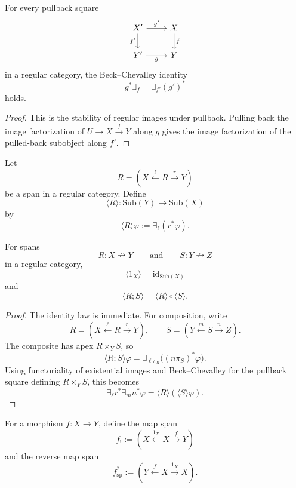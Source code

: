 \begin{proposition}
\label{prop:regular-beck-chevalley-relative}
For every pullback square
\[
\begin{tikzcd}
X' \arrow[r,"g'"] \arrow[d,"f'"']
&
X \arrow[d,"f"]
\\
Y' \arrow[r,"g"']
&
Y
\end{tikzcd}
\]
in a regular category, the Beck--Chevalley identity
\[
g^\ast\exists_f=\exists_{f'}(g')^\ast
\]
holds.
\end{proposition}

\begin{proof}
This is the stability of regular images under pullback. Pulling back the
image factorization of \(U\to X\xrightarrow{f}Y\) along \(g\) gives the image
factorization of the pulled-back subobject along \(f'\).
\end{proof}

\begin{definition}
\label{def:span-diamond-relative}
Let
\[
R=
\left(
X\xleftarrow{\ell}R\xrightarrow{r}Y
\right)
\]
be a span in a regular category. Define
\[
\langle R\rangle:\mathrm{Sub}(Y)\to\mathrm{Sub}(X)
\]
by
\[
\langle R\rangle\varphi
:=
\exists_\ell(r^\ast\varphi).
\]
\end{definition}

\begin{proposition}
\label{prop:diamond-functoriality-relative}
For spans
\[
R:X\nrightarrow Y
\qquad\text{and}\qquad
S:Y\nrightarrow Z
\]
in a regular category,
\[
\langle 1_X\rangle=\mathrm{id}_{\mathrm{Sub}(X)}
\]
and
\[
\langle R;S\rangle
=
\langle R\rangle\circ\langle S\rangle.
\]
\end{proposition}

\begin{proof}
The identity law is immediate. For composition, write
\[
R=(X\xleftarrow{\ell}R\xrightarrow{r}Y),
\qquad
S=(Y\xleftarrow{m}S\xrightarrow{n}Z).
\]
The composite has apex \(R\times_Y S\), so
\[
\langle R;S\rangle\varphi
=
\exists_{\ell\pi_R}\bigl((n\pi_S)^\ast\varphi\bigr).
\]
Using functoriality of existential images and Beck--Chevalley for the
pullback square defining \(R\times_Y S\), this becomes
\[
\exists_\ell r^\ast\exists_m n^\ast\varphi
=
\langle R\rangle(\langle S\rangle\varphi).
\]
\end{proof}

For a morphism \(f:X\to Y\), define the map span
\[
f_!:=
\left(
X\xleftarrow{1_X}X\xrightarrow{f}Y
\right)
\]
and the reverse map span
\[
f^\ast_{\mathrm{sp}}:=
\left(
Y\xleftarrow{f}X\xrightarrow{1_X}X
\right).
\]

